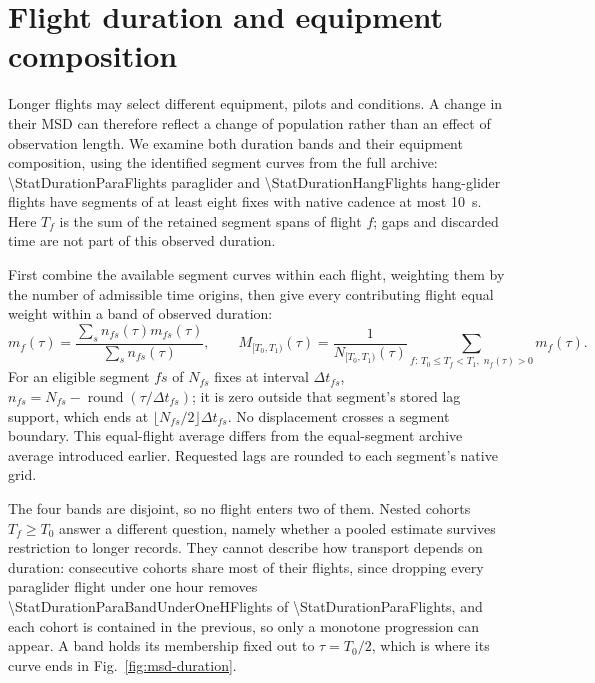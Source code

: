 

\FloatBarrier

\FloatBarrier
\section{Flight duration and equipment composition}
\label{sec:duration-check}

Longer flights may select different equipment, pilots and conditions. A change in their
MSD can therefore reflect a change of population rather than an effect of observation
length. We examine both duration bands and their equipment composition, using the
identified segment curves from the full archive: \num{\StatDurationParaFlights} paraglider
and \num{\StatDurationHangFlights} hang-glider flights have segments of at least
eight fixes with native cadence at most \SI{10}{\second}. Here $T_f$ is the sum of the retained segment spans
of flight $f$; gaps and discarded time are not part of this observed duration.

First combine the available segment curves within each flight, weighting them by the
number of admissible time origins, then give every contributing flight equal weight
within a band of observed duration:
\begin{equation}
 m_f(\tau)=\frac{\sum_s n_{fs}(\tau)m_{fs}(\tau)}{\sum_s n_{fs}(\tau)},\qquad
 M_{[T_0,T_1)}(\tau)=\frac{1}{N_{[T_0,T_1)}(\tau)}
      \sum_{f:\,T_0\le T_f<T_1,\;n_f(\tau)>0}m_f(\tau).
 \label{eq:duration-flight-msd}
\end{equation}
For an eligible segment $fs$ of $N_{fs}$ fixes at interval $\Delta t_{fs}$,
$n_{fs}=N_{fs}-\operatorname{round}(\tau/\Delta t_{fs})$; it is zero outside that segment's
stored lag support, which ends at $\lfloor N_{fs}/2\rfloor\Delta t_{fs}$. No displacement
crosses a segment boundary. This equal-flight average differs from the equal-segment
archive average introduced earlier. Requested lags are rounded to each segment's native grid.

The four bands are disjoint, so no flight enters two of them. Nested cohorts
$T_f\ge T_0$ answer a different question, namely whether a pooled estimate survives
restriction to longer records. They cannot describe how transport depends on duration:
consecutive cohorts share most of their flights, since dropping every paraglider flight
under one hour removes \num{\StatDurationParaBandUnderOneHFlights} of
\num{\StatDurationParaFlights}, and each cohort is contained in the previous, so only a
monotone progression can appear. A band holds its membership fixed out to $\tau=T_0/2$,
which is where its curve ends in Fig.~\ref{fig:msd-duration}.

